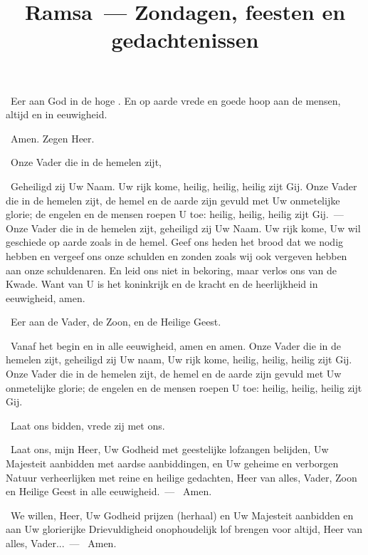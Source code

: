 \documentclass[12pt,twoside,a5paper]{article}
\begin{document}
\title{Ramsa~--- Zondagen, feesten en gedachtenissen}
\author{}
\date{}
\maketitle

\footnotelayout{\ }


\begin{halfparskip}
  \cc~Eer aan God in de hoge . En op aarde vrede en goede hoop aan de mensen, altijd en in eeuwigheid.

  \rr~Amen. Zegen Heer. 

  \cc~Onze Vader die in de hemelen zijt,

  \rr~Geheiligd zij Uw Naam. Uw rijk kome, heilig, heilig, heilig zijt Gij. Onze Vader die in de hemelen zijt, de hemel en de aarde zijn gevuld met Uw onmetelijke glorie; de engelen en de mensen roepen U toe: heilig, heilig, heilig zijt Gij.~--- Onze Vader die in de hemelen zijt, geheiligd zij Uw Naam. Uw rijk kome, Uw wil geschiede op aarde zoals in de hemel. Geef ons heden het brood dat we nodig hebben en vergeef ons onze schulden en zonden zoals wij ook vergeven hebben aan onze schuldenaren. En leid ons niet in bekoring, maar verlos ons van de Kwade. Want van U is het koninkrijk en de kracht en de heerlijkheid in eeuwigheid, amen.

  \cc~Eer aan de Vader, de Zoon, en de Heilige Geest.

  \rr~Vanaf het begin en in alle eeuwigheid, amen en amen. Onze Vader die in de hemelen zijt, geheiligd zij Uw naam, Uw rijk kome, heilig, heilig, heilig zijt Gij. Onze Vader die in de hemelen zijt, de hemel en de aarde zijn gevuld met Uw onmetelijke glorie; de engelen en de mensen roepen U toe: heilig, heilig, heilig zijt Gij.

  \dd~Laat ons bidden, vrede zij met ons.

   \cc~Laat ons, mijn Heer, Uw Godheid met geestelijke lofzangen belijden, Uw Majesteit aanbidden met aardse aanbiddingen, en Uw geheime en verborgen Natuur verheerlijken met reine en heilige gedachten, Heer van alles, Vader, Zoon en Heilige Geest in alle eeuwigheid.~--- \rr~Amen.

   \cc~We willen, Heer, Uw Godheid prijzen (herhaal) en Uw Majesteit aanbidden en aan Uw glorierijke Drievuldigheid onophoudelijk lof brengen voor altijd, Heer van alles, Vader...~--- \rr~Amen.
\end{halfparskip}
\end{document}
